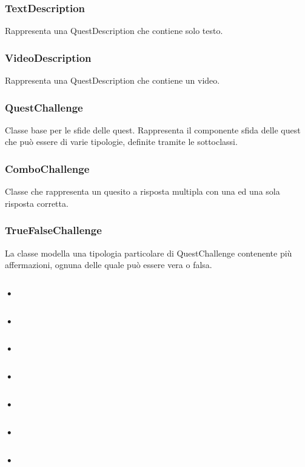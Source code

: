 \subsubsection{TextDescription} Rappresenta una QuestDescription che contiene solo testo.
\subsubsection{VideoDescription} Rappresenta una QuestDescription che contiene un video.
\subsubsection{QuestChallenge} Classe base per le sfide delle quest. Rappresenta il componente sfida delle quest che può essere di varie tipologie, definite tramite le sottoclassi.
\subsubsection{ComboChallenge} Classe che rappresenta un quesito a risposta multipla con una ed una sola risposta corretta.
\subsubsection{TrueFalseChallenge} La classe modella una tipologia particolare di QuestChallenge contenente più affermazioni, ognuna delle quale può essere vera o falsa.
\subsubsection{•}
\subsubsection{•}
\subsubsection{•}
\subsubsection{•}
\subsubsection{•}
\subsubsection{•}
\subsubsection{•}




